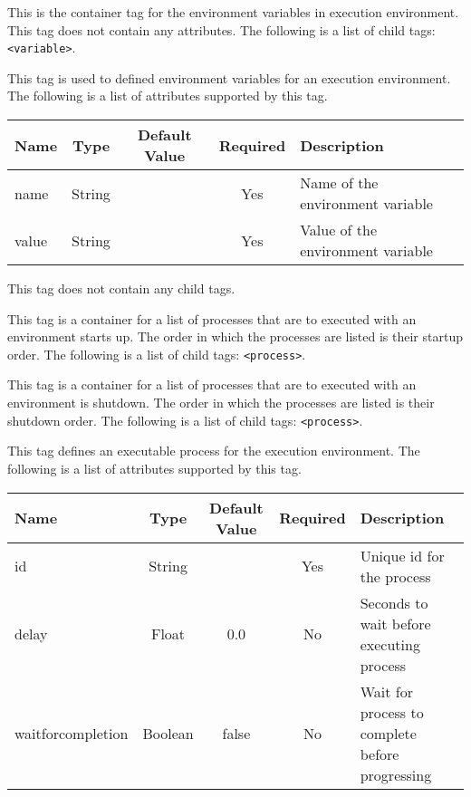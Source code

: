 This is the container tag for the environment variables in execution 
environment. This tag does not contain any attributes. The following 
is a list of child tags: \texttt{<variable>}.


This tag is used to defined environment variables for an execution
environment. The following is a list of attributes supported
by this tag.
\begin{table}[h]
  \begin{tabular}{lcccl}
  \hline
  \textbf{Name} & \textbf{Type} & \textbf{Default Value} & \textbf{Required} & \textbf{Description} \\
  \hline
  name & String  & & Yes & Name of the environment variable \\
  value & String & & Yes & Value of the environment variable \\
  \end{tabular}
\end{table}

\noindent This tag does not contain any child tags.


This tag is a container for a list of processes that are to 
executed with an environment starts up. The order in which 
the processes are listed is their startup order. The following 
is a list of child tags: \texttt{<process>}.


This tag is a container for a list of processes that are to 
executed with an environment is shutdown. The order in which 
the processes are listed is their shutdown order. The following 
is a list of child tags: \texttt{<process>}.


This tag defines an executable process for the execution
environment. The following is a list of attributes supported
by this tag.
\begin{table}[h]
  \begin{tabular}{lcccl}
  \hline
  \textbf{Name} & \textbf{Type} & \textbf{Default Value} & \textbf{Required} & \textbf{Description} \\
  \hline
  id & String  & & Yes & Unique id for the process \\
  delay & Float & 0.0 & No & Seconds to wait before executing process \\
  waitforcompletion & Boolean & false & No & Wait for process to complete before progressing \\
  \end{tabular}
\end{table}


